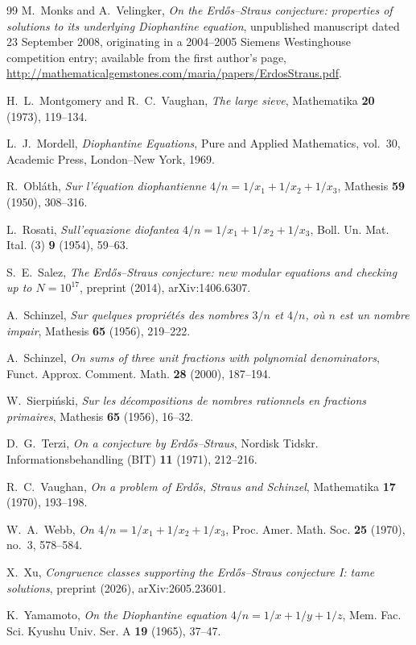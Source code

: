\documentclass[11pt,reqno]{amsart}
\theoremstyle{plain}
\theoremstyle{definition}
\numberwithin{equation}{section}
\begin{document}
\begin{thebibliography}{99}
M.~Monks and A.~Velingker,
\emph{On the Erd\H{o}s--Straus conjecture: properties of solutions to its underlying
Diophantine equation},
unpublished manuscript dated 23 September 2008, originating in a 2004--2005 Siemens
Westinghouse competition entry; available from the first author's page,
\url{http://mathematicalgemstones.com/maria/papers/ErdosStraus.pdf}.

H.~L.~Montgomery and R.~C.~Vaughan,
\emph{The large sieve},
Mathematika \textbf{20} (1973), 119--134.

L.~J.~Mordell,
\emph{Diophantine Equations},
Pure and Applied Mathematics, vol.~30, Academic Press, London--New York, 1969.

R.~Obl\'ath,
\emph{Sur l'\'equation diophantienne $4/n=1/x_{1}+1/x_{2}+1/x_{3}$},
Mathesis \textbf{59} (1950), 308--316.

L.~Rosati,
\emph{Sull'equazione diofantea $4/n=1/x_{1}+1/x_{2}+1/x_{3}$},
Boll. Un. Mat. Ital. (3) \textbf{9} (1954), 59--63.

S.~E.~Salez,
\emph{The Erd\H{o}s--Straus conjecture: new modular equations and checking up to
$N=10^{17}$},
preprint (2014), arXiv:1406.6307.

A.~Schinzel,
\emph{Sur quelques propri\'et\'es des nombres $3/n$ et $4/n$, o\`u $n$ est un nombre
impair},
Mathesis \textbf{65} (1956), 219--222.

A.~Schinzel,
\emph{On sums of three unit fractions with polynomial denominators},
Funct. Approx. Comment. Math. \textbf{28} (2000), 187--194.

W.~Sierpi\'nski,
\emph{Sur les d\'ecompositions de nombres rationnels en fractions primaires},
Mathesis \textbf{65} (1956), 16--32.

D.~G.~Terzi,
\emph{On a conjecture by Erd\H{o}s--Straus},
Nordisk Tidskr. Informationsbehandling (BIT) \textbf{11} (1971), 212--216.

R.~C.~Vaughan,
\emph{On a problem of Erd\H{o}s, Straus and Schinzel},
Mathematika \textbf{17} (1970), 193--198.

W.~A.~Webb,
\emph{On $4/n=1/x_{1}+1/x_{2}+1/x_{3}$},
Proc. Amer. Math. Soc. \textbf{25} (1970), no.~3, 578--584.

X.~Xu,
\emph{Congruence classes supporting the Erd\H{o}s--Straus conjecture I: tame
solutions},
preprint (2026), arXiv:2605.23601.

K.~Yamamoto,
\emph{On the Diophantine equation $4/n=1/x+1/y+1/z$},
Mem. Fac. Sci. Kyushu Univ. Ser. A \textbf{19} (1965), 37--47.

\end{thebibliography}
\end{document}
